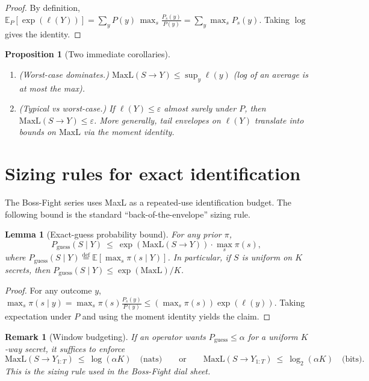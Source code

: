 \documentclass[11pt]{article}
\newcommand{\EE}{\mathbb{E}}
\newcommand{\defeq}{\stackrel{\mathrm{def}}{=}}
\newtheorem{lemma}{Lemma}
\newtheorem{proposition}{Proposition}
\newtheorem{remark}{Remark}
\begin{document}
\begin{proof}
By definition,
$\EE_P[\exp(\ell(Y))]=\sum_y P(y)\,\max_s \tfrac{P_s(y)}{P(y)}=\sum_y \max_s P_s(y)$.
Taking $\log$ gives the identity.
\end{proof}

\begin{proposition}[Two immediate corollaries]
\begin{enumerate}[leftmargin=*]
\item (Worst-case dominates.) $\mathrm{MaxL}(S\to Y)\le \sup_y \ell(y)$ (log of an average is at most the max).
\item (Typical vs worst-case.) If $\ell(Y)\le \varepsilon$ almost surely under $P$, then $\mathrm{MaxL}(S\to Y)\le \varepsilon$.
More generally, tail envelopes on $\ell(Y)$ translate into bounds on $\mathrm{MaxL}$ via the moment identity.
\end{enumerate}
\end{proposition}

\section{Sizing rules for exact identification}
The Boss-Fight series uses MaxL as a repeated-use identification budget.
The following bound is the standard ``back-of-the-envelope'' sizing rule.

\begin{lemma}[Exact-guess probability bound]
For any prior $\pi$,
\[
P_{\mathrm{guess}}(S\mid Y)\ \le\ \exp(\mathrm{MaxL}(S\to Y))\cdot \max_{s}\pi(s),
\]
where $P_{\mathrm{guess}}(S\mid Y)\defeq \EE[\max_s \pi(s\mid Y)]$.
In particular, if $S$ is uniform on $K$ secrets, then
$P_{\mathrm{guess}}(S\mid Y)\le \exp(\mathrm{MaxL})/K$.
\end{lemma}

\begin{proof}
For any outcome $y$, $\max_s \pi(s\mid y)=\max_s \pi(s)\tfrac{P_s(y)}{P(y)}\le (\max_s \pi(s))\exp(\ell(y))$.
Taking expectation under $P$ and using the moment identity yields the claim.
\end{proof}

\begin{remark}[Window budgeting]
If an operator wants $P_{\mathrm{guess}}\le \alpha$ for a uniform $K$-way secret, it suffices to enforce
\[
\mathrm{MaxL}(S\to Y_{1:T})\ \le\ \log(\alpha K)\quad\text{(nats)}
\qquad\text{or}\qquad
\mathrm{MaxL}(S\to Y_{1:T})\ \le\ \log_2(\alpha K)\quad\text{(bits)}.
\]
This is the sizing rule used in the Boss-Fight dial sheet.
\end{remark}
\end{document}

